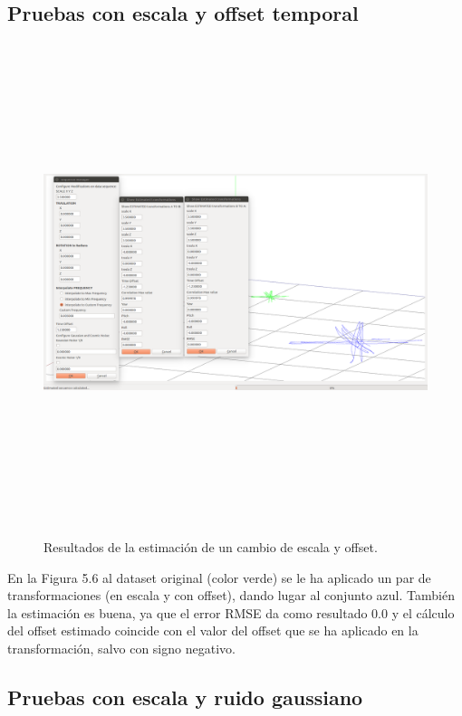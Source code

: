 \subsection{Pruebas con escala y offset temporal}
\begin{figure}[H]
\begin{center}
\label{fig:opciones de View}\includegraphics[height=14.0cm,width=18.0cm]{img/cap6/Escala_Offset_abba.png}
\hspace{0.5cm}

\end{center}

\caption{Resultados de la estimación de un cambio de escala y offset.}
\end{figure}

En la Figura 5.6 al dataset original (color verde) se le ha aplicado un par de transformaciones (en escala y con offset), dando lugar al conjunto azul. También la estimación es buena, ya que el error RMSE da como resultado 0.0 y el cálculo del offset estimado coincide con el valor del offset que se ha aplicado en la transformación, salvo con signo negativo.

\subsection{Pruebas con escala y ruido gaussiano}

